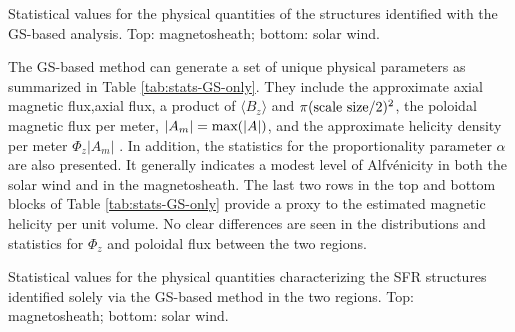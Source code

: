 \begin{table}
    \centering
    \caption[Statistical values for the physical quantities of structures identified with GS-based analysis analysis]{Statistical values for the physical quantities of the structures identified with the GS-based analysis. Top: magnetosheath; bottom: solar wind.}
    
    \label{tab:stats-GS}
\end{table}

The GS-based method can generate a set of unique physical parameters \citep{Hu:2017} as summarized in Table \ref{tab:stats-GS-only}. They include the approximate axial magnetic flux,\gls{axial flux}, a product of $\langle B_z\rangle$ and $\pi(\textnormal{scale size}/2)^2$, the poloidal magnetic flux per meter, $|A_m| = \textnormal{max}(|A|)$, and the approximate helicity density per meter $\Phi_z|A_m|$ \citep{Hu:2014}. In addition, the statistics for the proportionality parameter $\alpha$ are also presented. It generally indicates a modest level of Alfv\'enicity in both the solar wind and in the magnetosheath. The last two rows in the top and bottom blocks of Table \ref{tab:stats-GS-only} provide a proxy to the estimated magnetic helicity per unit volume. No clear differences are seen in the distributions and statistics for $\Phi_z$ and \gls{poloidal flux} between the two regions.
\begin{table}[ht!]
    \caption[Statistical values for the physical quantities of SFR structures identified solely via the GS-based method]{Statistical values for the physical quantities characterizing the SFR structures identified solely via the GS-based method in the two regions. Top: magnetosheath; bottom: solar wind.}
    \centering
    
    \label{tab:stats-GS-only}
\end{table}



